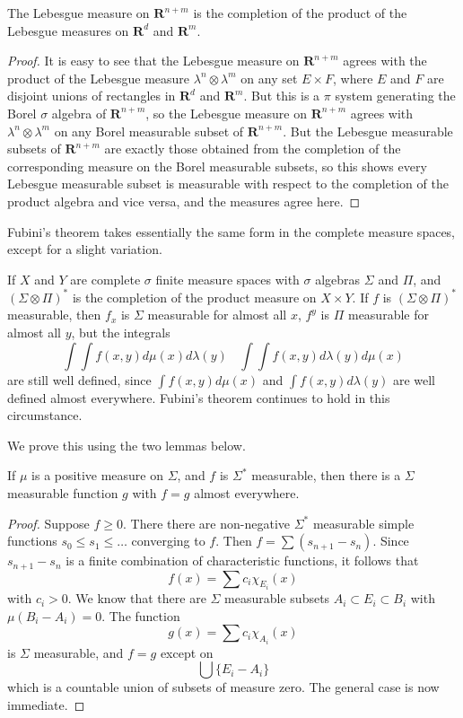 \begin{theorem}
    The Lebesgue measure on $\mathbf{R}^{n + m}$ is the completion of the product of the Lebesgue measures on $\mathbf{R}^d$ and $\mathbf{R}^m$.
\end{theorem}
\begin{proof}
    It is easy to see that the Lebesgue measure on $\mathbf{R}^{n+m}$ agrees with the product of the Lebesgue measure $\lambda^n \otimes \lambda^m$ on any set $E \times F$, where $E$ and $F$ are disjoint unions of rectangles in $\mathbf{R}^d$ and $\mathbf{R}^m$. But this is a $\pi$ system generating the Borel $\sigma$ algebra of $\mathbf{R}^{n+m}$, so the Lebesgue measure on $\mathbf{R}^{n+m}$ agrees with $\lambda^n \otimes \lambda^m$ on any Borel measurable subset of $\mathbf{R}^{n+m}$. But the Lebesgue measurable subsets of $\mathbf{R}^{n+m}$ are exactly those obtained from the completion of the corresponding measure on the Borel measurable subsets, so this shows every Lebesgue measurable subset is measurable with respect to the completion of the product algebra and vice versa, and the measures agree here.
\end{proof}

Fubini's theorem takes essentially the same form in the complete measure spaces, except for a slight variation.

\begin{theorem}
    If $X$ and $Y$ are complete $\sigma$ finite measure spaces with $\sigma$ algebras $\Sigma$ and $\Pi$, and $(\Sigma \otimes \Pi)^*$ is the completion of the product measure on $X \times Y$. If $f$ is $(\Sigma \otimes \Pi)^*$ measurable, then $f_x$ is $\Sigma$ measurable for almost all $x$, $f^y$ is $\Pi$ measurable for almost all $y$, but the integrals
    \[ \int \int f(x,y) d\mu(x) d\lambda(y)\ \ \ \ \int \int f(x,y) d\lambda(y) d\mu(x) \]
    are still well defined, since $\int f(x,y) d\mu(x)$ and $\int f(x,y) d\lambda(y)$ are well defined almost everywhere. Fubini's theorem continues to hold in this circumstance.
\end{theorem}

We prove this using the two lemmas below.

\begin{lemma}
    If $\mu$ is a positive measure on $\Sigma$, and $f$ is $\Sigma^*$ measurable, then there is a $\Sigma$ measurable function $g$ with $f = g$ almost everywhere.
\end{lemma}
\begin{proof}
    Suppose $f \geq 0$. There there are non-negative $\Sigma^*$ measurable simple functions $s_0 \leq s_1 \leq \dots$ converging to $f$. Then $f = \sum (s_{n+1} - s_n)$. Since $s_{n+1} - s_n$ is a finite combination of characteristic functions, it follows that
    \[ f(x) = \sum c_i \chi_{E_i}(x) \]
    with $c_i > 0$. We know that there are $\Sigma$ measurable subsets $A_i \subset E_i \subset B_i$ with $\mu(B_i - A_i) = 0$. The function
    \[ g(x) = \sum c_i \chi_{A_i}(x) \]
    is $\Sigma$ measurable, and $f = g$ except on
    \[ \bigcup \{ E_i - A_i \} \]
    which is a countable union of subsets of measure zero. The general case is now immediate.
\end{proof}

